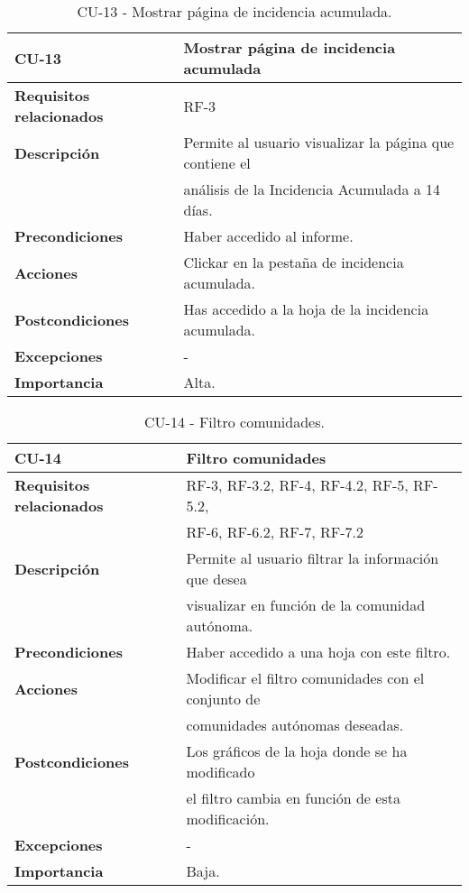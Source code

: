 \begin{table}[ht!]
    \centering
    \resizebox{15cm}{!} {
    \begin{tabular}{|l|l|}
    \hline
         \textbf{CU-13}     &  \textbf{Mostrar página de incidencia acumulada} \\ \hline
         \textbf{Requisitos relacionados}       & RF-3 \\ \hline
         \textbf{Descripción}    & Permite al usuario visualizar la página que contiene el \\&análisis de la Incidencia Acumulada a 14 días. \\ \hline   
         \textbf{Precondiciones}      & Haber accedido al informe. \\ \hline
         \textbf{Acciones} &Clickar en la pestaña de incidencia acumulada. \\ \hline
         \textbf{Postcondiciones}       &  Has accedido a la hoja de la incidencia acumulada. \\ \hline
         \textbf{Excepciones}       & -  \\ \hline
         \textbf{Importancia}   &Alta. \\
         \hline
    \end{tabular}}
    \caption{CU-13 - Mostrar página de incidencia acumulada.}
    \label{tab:my_label}
\end{table}

\begin{table}[ht!]
    \centering
    \resizebox{15cm}{!} {
    \begin{tabular}{|l|l|}
    \hline
         \textbf{CU-14}     &  \textbf{Filtro comunidades} \\ \hline
         \textbf{Requisitos relacionados}       & RF-3, RF-3.2, RF-4, RF-4.2, RF-5, RF-5.2, \\&RF-6, RF-6.2, RF-7, RF-7.2 \\ \hline
         \textbf{Descripción}    & Permite al usuario filtrar la información que desea \\&visualizar en función de la comunidad autónoma. \\ \hline   
         \textbf{Precondiciones}      & Haber accedido a una hoja con este filtro. \\ \hline
         \textbf{Acciones}      &  Modificar el filtro comunidades con el conjunto de\\& comunidades autónomas deseadas. \\ \hline
         \textbf{Postcondiciones}       & Los gráficos de la hoja donde se ha modificado \\& el filtro cambia en función de esta modificación. \\ \hline
         \textbf{Excepciones}       & - \\ \hline
         \textbf{Importancia}   & Baja. \\
         \hline
    \end{tabular}}
    \caption{CU-14 - Filtro comunidades.}
    \label{tab:my_label}
\end{table}

